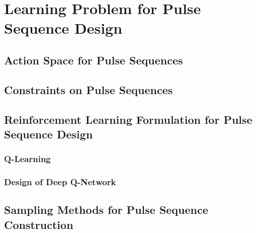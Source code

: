 \chapter{Learning Problem for Pulse Sequence Design}


\section{Action Space for Pulse Sequences}



\section{Constraints on Pulse Sequences}



\section{Reinforcement Learning Formulation for Pulse Sequence Design}

\subsection{Q-Learning}

\subsection{Design of Deep Q-Network}


\section{Sampling Methods for Pulse Sequence Construction}
